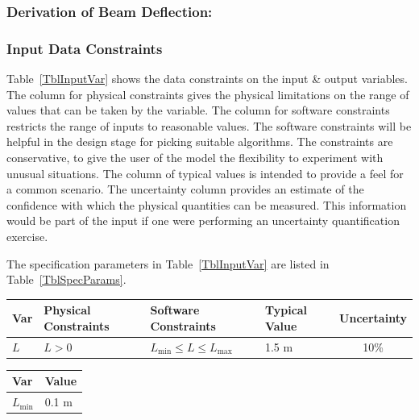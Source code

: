 \documentclass[12pt]{article}
\begin{document}
\subsubsection*{Derivation of Beam Deflection:}


\subsubsection{Input Data Constraints}
\label{sec_DataConstraints}

Table~\ref{TblInputVar} shows the data constraints on the input \& output
variables.  The column for physical constraints gives the physical limitations
on the range of values that can be taken by the variable.  The column for
software constraints restricts the range of inputs to reasonable values.  The
software constraints will be helpful in the design stage for picking suitable
algorithms.  The constraints are conservative, to give the user of the model the
flexibility to experiment with unusual situations.  The column of typical values
is intended to provide a feel for a common scenario.  The uncertainty column
provides an estimate of the confidence with which the physical quantities can be
measured.  This information would be part of the input if one were performing an
uncertainty quantification exercise.

The specification parameters in Table~\ref{TblInputVar} are listed in
Table~\ref{TblSpecParams}.

\begin{table}[!h]
    \caption{Input Variables} \label{TblInputVar}
    \renewcommand{\arraystretch}{1.2}
    \noindent \begin{longtable*}{l l l l c}
        \toprule
        \textbf{Var} & \textbf{Physical Constraints} & \textbf{Software Constraints} &
        \textbf{Typical Value} & \textbf{Uncertainty}\\
        \midrule
        $L$ & $L > 0$ & $L_{\text{min}} \leq L \leq L_{\text{max}}$ & 1.5 \si[per-mode=symbol] {\metre} & 10\%
        \\
        \bottomrule
    \end{longtable*}
\end{table}

\begin{table}[!h]
    \caption{Specification Parameter Values} \label{TblSpecParams}
    \renewcommand{\arraystretch}{1.2}
    \noindent \begin{longtable*}{l l}
        \toprule
        \textbf{Var} & \textbf{Value} \\
        \midrule
        $L_\text{min}$ & 0.1 \si{\metre}\\
        \bottomrule
    \end{longtable*}
\end{table}
\end{document}
